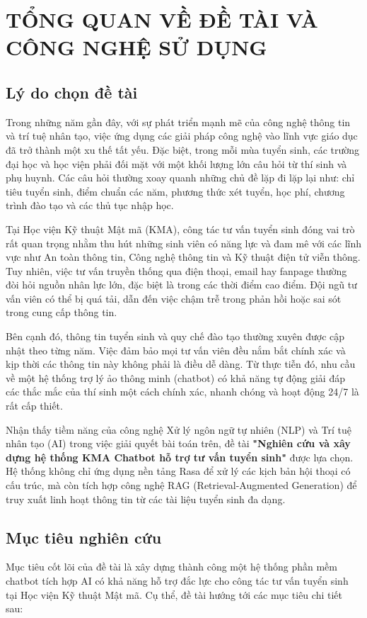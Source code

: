 \chapter{TỔNG QUAN VỀ ĐỀ TÀI VÀ CÔNG NGHỆ SỬ DỤNG}

\section{Lý do chọn đề tài}
Trong những năm gần đây, với sự phát triển mạnh mẽ của công nghệ thông tin và trí tuệ nhân tạo, việc ứng dụng các giải pháp công nghệ vào lĩnh vực giáo dục đã trở thành một xu thế tất yếu. Đặc biệt, trong mỗi mùa tuyển sinh, các trường đại học và học viện phải đối mặt với một khối lượng lớn câu hỏi từ thí sinh và phụ huynh. Các câu hỏi thường xoay quanh những chủ đề lặp đi lặp lại như: chỉ tiêu tuyển sinh, điểm chuẩn các năm, phương thức xét tuyển, học phí, chương trình đào tạo và các thủ tục nhập học. 

Tại Học viện Kỹ thuật Mật mã (KMA), công tác tư vấn tuyển sinh đóng vai trò rất quan trọng nhằm thu hút những sinh viên có năng lực và đam mê với các lĩnh vực như An toàn thông tin, Công nghệ thông tin và Kỹ thuật điện tử viễn thông. Tuy nhiên, việc tư vấn truyền thống qua điện thoại, email hay fanpage thường đòi hỏi nguồn nhân lực lớn, đặc biệt là trong các thời điểm cao điểm. Đội ngũ tư vấn viên có thể bị quá tải, dẫn đến việc chậm trễ trong phản hồi hoặc sai sót trong cung cấp thông tin.

Bên cạnh đó, thông tin tuyển sinh và quy chế đào tạo thường xuyên được cập nhật theo từng năm. Việc đảm bảo mọi tư vấn viên đều nắm bắt chính xác và kịp thời các thông tin này không phải là điều dễ dàng. Từ thực tiễn đó, nhu cầu về một hệ thống trợ lý ảo thông minh (chatbot) có khả năng tự động giải đáp các thắc mắc của thí sinh một cách chính xác, nhanh chóng và hoạt động 24/7 là rất cấp thiết.

Nhận thấy tiềm năng của công nghệ Xử lý ngôn ngữ tự nhiên (NLP) và Trí tuệ nhân tạo (AI) trong việc giải quyết bài toán trên, đề tài \textbf{"Nghiên cứu và xây dựng hệ thống KMA Chatbot hỗ trợ tư vấn tuyển sinh"} được lựa chọn. Hệ thống không chỉ ứng dụng nền tảng Rasa để xử lý các kịch bản hội thoại có cấu trúc, mà còn tích hợp công nghệ RAG (Retrieval-Augmented Generation) để truy xuất linh hoạt thông tin từ các tài liệu tuyển sinh đa dạng.

\section{Mục tiêu nghiên cứu}
Mục tiêu cốt lõi của đề tài là xây dựng thành công một hệ thống phần mềm chatbot tích hợp AI có khả năng hỗ trợ đắc lực cho công tác tư vấn tuyển sinh tại Học viện Kỹ thuật Mật mã. Cụ thể, đề tài hướng tới các mục tiêu chi tiết sau:

